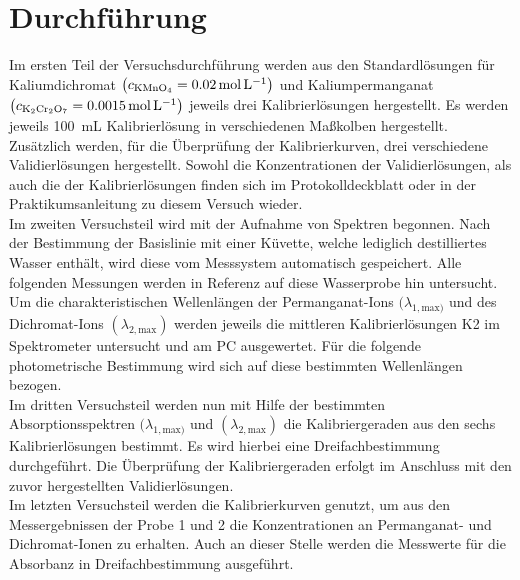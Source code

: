 \section{Durchführung}
\label{sec:durchfuerung}
Im ersten Teil der Versuchsdurchführung werden aus den Standardlösungen für Kaliumdichromat $\left(c_\text{\ce{KMnO4}}=\SI{0,02}{\mol \per \liter}\right)$ und Kaliumpermanganat  $\left(c_\text{\ce{K2Cr2O7}}=\SI{0,0015}{\mol \per \liter}\right)$ jeweils drei Kalibrierlösungen hergestellt. Es werden jeweils \SI{100}{\milli \liter} Kalibrierlösung in verschiedenen Maßkolben hergestellt. Zusätzlich werden, für die Überprüfung der Kalibrierkurven, drei verschiedene Validierlösungen hergestellt. Sowohl die Konzentrationen der Validierlösungen, als auch die der Kalibrierlösungen finden sich im Protokolldeckblatt oder in der Praktikumsanleitung zu diesem Versuch wieder.\\
Im zweiten Versuchsteil wird mit der Aufnahme von Spektren begonnen. Nach der Bestimmung der Basislinie mit einer Küvette, welche lediglich destilliertes Wasser enthält, wird diese vom Messsystem automatisch gespeichert. Alle folgenden Messungen werden in Referenz auf diese Wasserprobe hin untersucht. \linebreak
Um die charakteristischen Wellenlängen der Permanganat-Ions $(\lambda_{1,\text{max})}$ und des Dichromat-Ions $(\lambda_{2,\text{max}})$ werden jeweils die mittleren Kalibrierlösungen K2 im Spektrometer untersucht und am PC ausgewertet. Für die folgende photometrische Bestimmung wird sich auf diese bestimmten Wellenlängen bezogen.\\
Im dritten Versuchsteil werden nun mit Hilfe der bestimmten Absorptionsspektren $(\lambda_{1,\text{max})}$ und $(\lambda_{2,\text{max}})$ die Kalibriergeraden aus den sechs Kalibrierlösungen bestimmt. Es wird hierbei eine Dreifachbestimmung durchgeführt. Die Überprüfung der Kalibriergeraden erfolgt im Anschluss mit den zuvor hergestellten Validierlösungen.\\
Im letzten Versuchsteil werden die Kalibrierkurven genutzt, um aus den Messergebnissen der Probe 1 und 2 die Konzentrationen an Permanganat- und Dichromat-Ionen zu erhalten. Auch an dieser Stelle werden die Messwerte für die Absorbanz in Dreifachbestimmung ausgeführt.